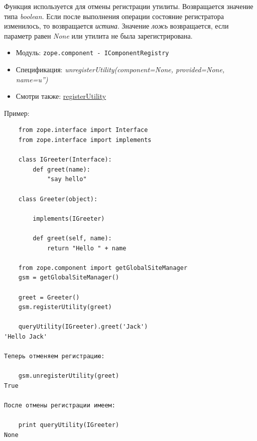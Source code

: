 \documentclass[a4paper,openany,twoside,final]{book}
\providecommand*{\DUroletitlereference}[1]{\textsl{#1}}
\begin{document}
Функция используется для отмены регистрации утилиты.  Возвращается значение типа \DUroletitlereference{boolean}.  Если после выполнения операции состояние регистратора изменилось, то возвращается \DUroletitlereference{истина}.  Значение \DUroletitlereference{ложь} возвращается, если параметр равен \DUroletitlereference{None} или утилита не была зарегистрирована.

\begin{itemize}

\item Модуль: \texttt{zope.component - IComponentRegistry}

\item Спецификация: \DUroletitlereference{unregisterUtility(component=None, provided=None, name=u'')}

\item Смотри также: \hyperref[registerutility]{registerUtility}

\end{itemize}

Пример:

\begin{verbatim}
    from zope.interface import Interface
    from zope.interface import implements

    class IGreeter(Interface):
        def greet(name):
            "say hello"

    class Greeter(object):

        implements(IGreeter)

        def greet(self, name):
            return "Hello " + name

    from zope.component import getGlobalSiteManager
    gsm = getGlobalSiteManager()

    greet = Greeter()
    gsm.registerUtility(greet)

    queryUtility(IGreeter).greet('Jack')
'Hello Jack'

Теперь отменяем регистрацию:

    gsm.unregisterUtility(greet)
True

После отмены регистрации имеем:

    print queryUtility(IGreeter)
None
\end{verbatim}

\end{document}
